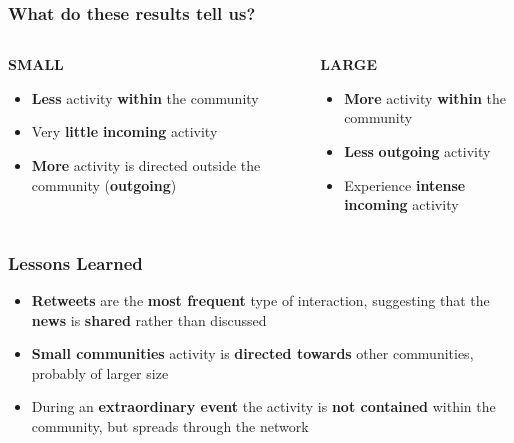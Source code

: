 \documentclass{beamer}
\begin{document}
\begin{frame}
\frametitle{What do these results tell us?}

\begin{columns}
	\begin{column}[T]{0.4\textwidth}
	{
	\centering
	\begin{tcolorbox}[width=3cm, colframe=black, colback=white, halign=center]
	\textbf{SMALL} 
	\end{tcolorbox}
	}

	\begin{itemize}
		\item \textbf{Less} activity \textbf{within} the community
		\vspace{0.4cm}
		\item Very \textbf{little} \textbf{incoming} activity
		\vspace{0.4cm}
		\item \textbf{More} activity is directed outside the community (\textbf{outgoing})
		
	\end{itemize}
	\end{column}


	\begin{column}[T]{0.4\textwidth}
	{
	\centering
	\begin{tcolorbox}[width=3cm, colframe=black, colback=white, halign=center]
	\textbf{LARGE}
	\end{tcolorbox}
	}
	\begin{itemize}
		\item \textbf{More} activity \textbf{within} the community 
		\vspace{0.4cm}
		\item \textbf{Less} \textbf{outgoing} activity
		\vspace{0.4cm}
		\item Experience \textbf{intense} \textbf{incoming} activity
	\end{itemize}
	\end{column}
\end{columns}
\end{frame}

\begin{frame}
\frametitle{Lessons Learned}

\begin{itemize}
	\item \textbf{Retweets} are the \textbf{most frequent} type of interaction, suggesting that the \textbf{news} is \textbf{shared} rather than discussed
	\vspace{0.5cm}
	\item \textbf{Small communities} activity is \textbf{directed towards} other communities, probably of larger size 
	\vspace{0.5cm}
	\item During an \textbf{extraordinary event} the activity is \textbf{not contained} within the community, but spreads through the network 
\end{itemize}
\end{frame}
\end{document}
